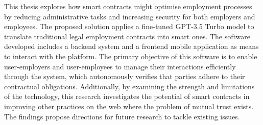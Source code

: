 This thesis explores how smart contracts might optimise employment processes by reducing administrative tasks and increasing security for both employers and employees. The proposed solution applies a fine-tuned GPT-3.5 Turbo model to translate traditional legal employment contracts into smart ones. The software developed includes a backend system and a frontend mobile application as means to interact with the platform. The primary objective of this software is to enable user-employers and user-employees to manage their interactions efficiently through the system, which autonomously verifies that parties adhere to their contractual obligations. Additionally, by examining the strength and limitations of the technology, this research investigates the potential of smart contracts in improving other practices on the web where the problem of mutual trust exists. The findings propose directions for future research to tackle existing issues.